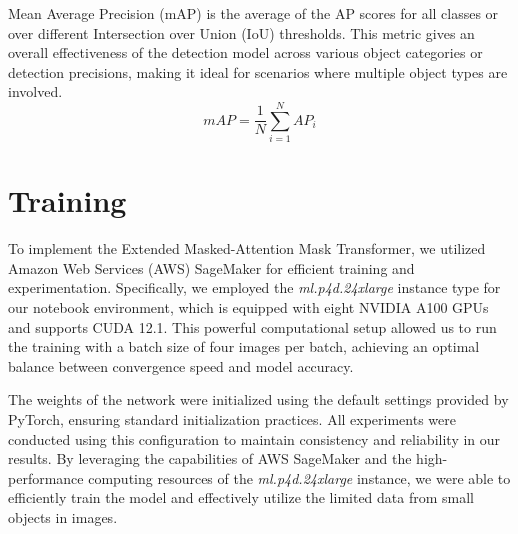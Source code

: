 Mean Average Precision (mAP) is the average of the AP scores for all classes or over different Intersection over Union (IoU) thresholds. 
This metric gives an overall effectiveness of the detection model across various object categories or detection precisions, making it ideal for 
scenarios where multiple object types are involved.
\[mAP = \frac{1}{N} \sum_{i=1}^{N} AP_i\]


\newpage
\section{Training}

To implement the Extended Masked-Attention Mask Transformer, we utilized Amazon Web Services (AWS) SageMaker for efficient training and experimentation. 
Specifically, we employed the \textit{ml.p4d.24xlarge} instance type for our notebook environment, which is equipped with eight NVIDIA A100 GPUs and supports CUDA 12.1. 
This powerful computational setup allowed us to run the training with a batch size of four images per batch, achieving an optimal balance between convergence 
speed and model accuracy.

The weights of the network were initialized using the default settings provided by PyTorch, ensuring standard initialization practices. All experiments were 
conducted using this configuration to maintain consistency and reliability in our results. By leveraging the capabilities of AWS SageMaker and the high-performance 
computing resources of the \textit{ml.p4d.24xlarge} instance, we were able to efficiently train the model and effectively utilize the limited data from small objects in images.

